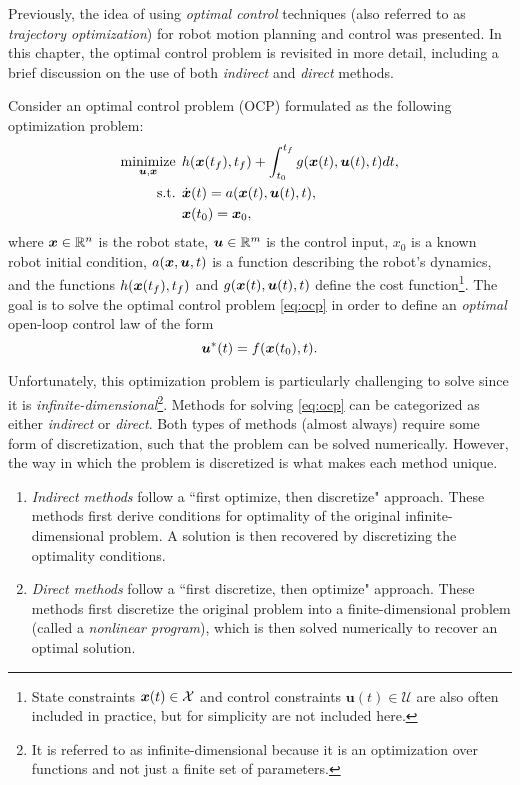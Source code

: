 Previously, the idea of using \textit{optimal control}\cite{Kirk2004} techniques (also referred to as \textit{trajectory optimization}) for robot motion planning and control was presented. In this chapter, the optimal control problem is revisited in more detail, including a brief discussion on the use of both \textit{indirect} and \textit{direct} methods.

Consider an optimal control problem (OCP) formulated as the following optimization problem:
\begin{equation} \label{eq:ocp}
\begin{split}
\underset{\bm{u},\bm{x}}{\text{minimize}} \:\: & h(\bm{x}(t_f),t_f) + \int_{t_0}^{t_f} g(\bm{x}(t),\bm{u}(t),t) dt,\\
\text{s.t.} \:\:& \dot{\bm{x}}(t) = a(\bm{x}(t),\bm{u}(t),t), \\
&\bm{x}(t_0) = \bm{x}_0,
\end{split}
\end{equation}
where $\bm{x} \in \mathbb{R}^n$ is the robot state, $\bm{u} \in \mathbb{R}^m$ is the control input, $x_0$ is a known robot initial condition, $a(\bm{x}, \bm{u}, t)$ is a function describing the robot's dynamics, and the functions $h(\bm{x}(t_f), t_f)$ and $g(\bm{x}(t), \bm{u}(t), t)$ define the cost function\footnote{State constraints $\bm{x}(t) \in \mathcal{X}$ and control constraints $\bm{u}(t) \in \mathcal{U}$ are also often included in practice, but for simplicity are not included here.}.
The goal is to solve the optimal control problem \eqref{eq:ocp} in order to define an \textit{optimal} open-loop control law of the form
\begin{equation*}
    \bm{u}^*(t) = f(\bm{x}(t_0), t).
\end{equation*}

Unfortunately, this optimization problem is particularly challenging to solve since it is \textit{infinite-dimensional}\footnote{It is referred to as infinite-dimensional because it is an optimization over functions and not just a finite set of parameters.}. Methods for solving \eqref{eq:ocp} can be categorized as either \textit{indirect} or \textit{direct}. Both types of methods (almost always) require some form of discretization, such that the problem can be solved numerically. However, the way in which the problem is discretized is what makes each method unique.

\begin{enumerate}
    \item \textit{Indirect methods} follow a ``first optimize, then discretize" approach. These methods first derive conditions for optimality of the original infinite-dimensional problem. A solution is then recovered by discretizing the optimality conditions.
    \item \textit{Direct methods} follow a ``first discretize, then optimize" approach. These methods first discretize the original problem into a finite-dimensional problem (called a \textit{nonlinear program}), which is then solved numerically to recover an optimal solution.
\end{enumerate}


